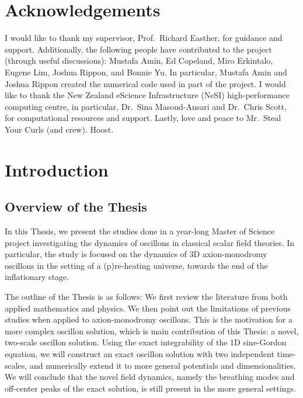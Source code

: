 \documentclass[11pt]{book}
\begin{document}
\setcounter{page}{1}
\pagestyle{headings}


\chapter*{Acknowledgements}

I would like to thank my supervisor, Prof.~Richard Easther, for guidance and support. Additionally, the following people have contributed to the project (through useful discussions): Mustafa Amin, Ed Copeland, Miro Erkintalo, Eugene Lim, Joshua Rippon, and Bonnie Yu. In particular, Mustafa Amin and Joshua Rippon created the numerical code used in part of the project.
\medbreak
I would like to thank the New Zealand eScience Infrastructure (NeSI) high-performance computing centre, in particular, Dr.~Sina Masoud-Ansari and Dr.~Chris Scott, for computational resources and support.
\medbreak
Lastly, love and peace to Mr.~Steal Your Curls (and crew). Hoost.

\setcounter{secnumdepth}{3} %
\setcounter{tocdepth}{3}    %
\tableofcontents            %

\chapter{Introduction}
\section{Overview of the Thesis}
In this Thesis, we present the studies done in a year-long Master of Science project investigating the dynamics of oscillons in classical scalar field theories. In particular, the study is focused on the dynamics of 3D axion-monodromy oscillons in the setting of a (p)re-heating universe, towards the end of the inflationary stage.

The outline of the Thesis is as follows: We first review the literature from both applied mathematics and physics. We then point out the limitations of previous studies when applied to axion-monodromy oscillons. This is the motivation for a more complex oscillon solution, which is main contribution of this Thesis: a novel, two-scale oscillon solution. Using the exact integrability of the 1D sine-Gordon equation, we will construct an exact oscillon solution with two independent time-scales, and numerically extend it to more general potentials and dimensionalities. We will conclude that the novel field dynamics, namely the breathing modes and off-center peaks of the exact solution, is still present in the more general settings.
\end{document}
